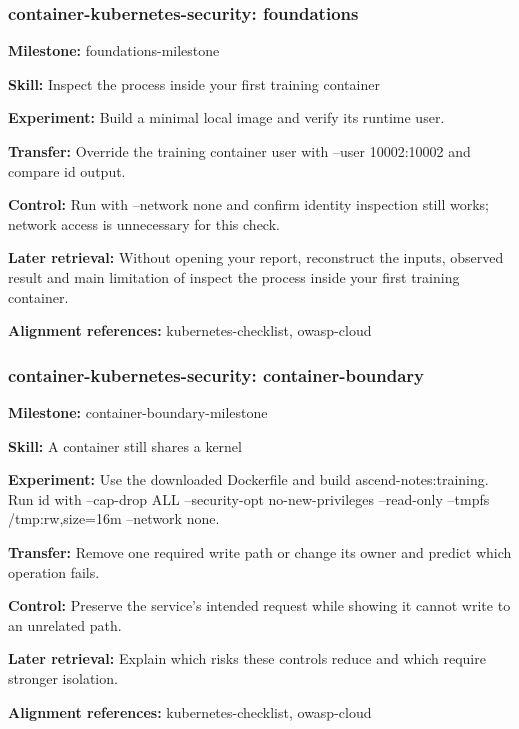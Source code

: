 \subsubsection{container-kubernetes-security: foundations}
\noindent\textbf{Milestone:} foundations-milestone\par
\noindent\textbf{Skill:} Inspect the process inside your first training container\par
\noindent\textbf{Experiment:} Build a minimal local image and verify its runtime user.\par
\noindent\textbf{Transfer:} Override the training container user with --user 10002:10002 and compare id output.\par
\noindent\textbf{Control:} Run with --network none and confirm identity inspection still works; network access is unnecessary for this check.\par
\noindent\textbf{Later retrieval:} Without opening your report, reconstruct the inputs, observed result and main limitation of inspect the process inside your first training container.\par
\noindent\textbf{Alignment references:} kubernetes-checklist, owasp-cloud\par
\subsubsection{container-kubernetes-security: container-boundary}
\noindent\textbf{Milestone:} container-boundary-milestone\par
\noindent\textbf{Skill:} A container still shares a kernel\par
\noindent\textbf{Experiment:} Use the downloaded Dockerfile and build ascend-notes:training. Run id with --cap-drop ALL --security-opt no-new-privileges --read-only --tmpfs /tmp:rw,size=16m --network none.\par
\noindent\textbf{Transfer:} Remove one required write path or change its owner and predict which operation fails.\par
\noindent\textbf{Control:} Preserve the service's intended request while showing it cannot write to an unrelated path.\par
\noindent\textbf{Later retrieval:} Explain which risks these controls reduce and which require stronger isolation.\par
\noindent\textbf{Alignment references:} kubernetes-checklist, owasp-cloud\par

